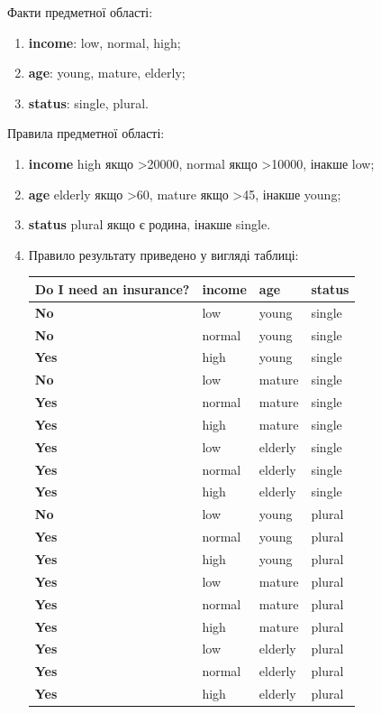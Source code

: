 Факти предметної області:
\begin{enumerate}
	\item \textbf{income}: low, normal, high; 
	\item \textbf{age}: young, mature, elderly;
	\item \textbf{status}: single, plural.
\end{enumerate}

Правила предметної області:
\begin{enumerate}
	\item \textbf{income} high якщо >20000, normal якщо >10000, інакше low; 
	\item \textbf{age} elderly якщо >60, mature якщо >45, інакше young;
	\item \textbf{status} plural якщо є родина, інакше single.
	\item Правило результату приведено у вигляді таблиці: \\
		\begin{tabular}{l|lll}
			\textbf{Do I need an insurance?} & \textbf{income} & \textbf{age} & \textbf{status} \\\hline 
			\textbf{No} & low & young & single \\ 
			\textbf{No} & normal & young & single \\ 
			\textbf{Yes} & high & young & single \\ 
			\textbf{No} & low & mature & single \\ 
			\textbf{Yes} & normal & mature & single \\ 
			\textbf{Yes} & high & mature & single \\ 
			\textbf{Yes} & low & elderly & single \\ 
			\textbf{Yes} & normal & elderly & single \\ 
			\textbf{Yes} & high & elderly & single \\ 
			\textbf{No} & low & young & plural \\ 
			\textbf{Yes} & normal & young & plural \\ 
			\textbf{Yes} & high & young & plural \\ 
			\textbf{Yes} & low & mature & plural \\ 
			\textbf{Yes} & normal & mature & plural \\ 
			\textbf{Yes} & high & mature & plural \\ 
			\textbf{Yes} & low & elderly & plural \\ 
			\textbf{Yes} & normal & elderly & plural \\ 
			\textbf{Yes} & high & elderly & plural \\ 
		\end{tabular}
\end{enumerate}

